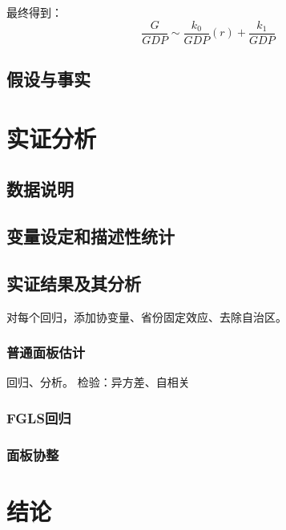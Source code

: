 \documentclass[10pt]{article}
\begin{document}
\added[remark={推导过程留待誊抄}]{}

最终得到：
\begin{equation}
\frac{G}{GDP} \sim \frac{k_0}{GDP}(r) + \frac{k_1}{GDP}
\end{equation}
\subsection{假设与事实}

\section{实证分析}
\subsection{数据说明}
\subsection{变量设定和描述性统计}

\subsection{实证结果及其分析}
对每个回归，添加协变量、省份固定效应、去除自治区。
\subsubsection{普通面板估计}
回归、分析。
检验：异方差、自相关
\subsubsection{FGLS回归}
\subsubsection{面板协整}



\section{结论}


\renewcommand\refname{参考文献}
%

\end{document}
